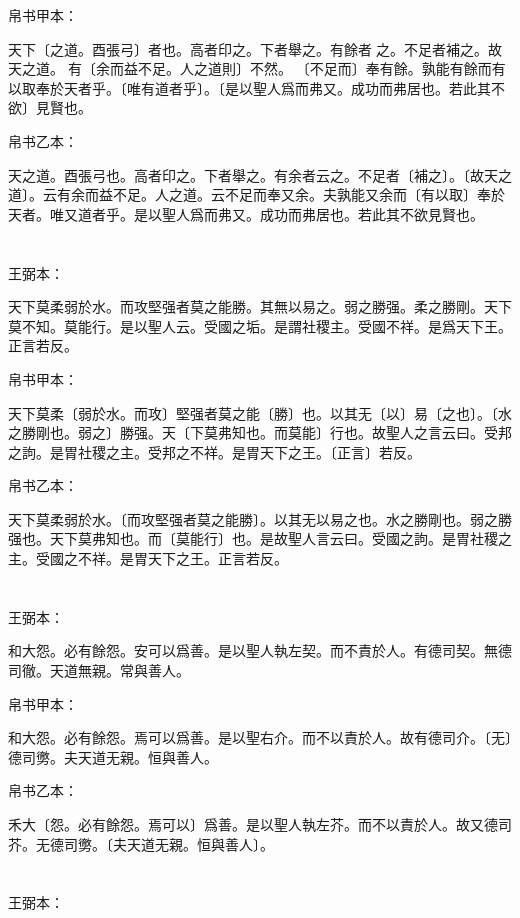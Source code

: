 \documentclass[a5paper]{ctexbook}
\begin{document}
    
    帛书甲本：

    天下〔之道。酉張弓〕者也。高者印之。下者舉之。有餘者𢿃之。不足者補之。故天之道。𢿃有〔余而益不足。人之道則〕不然。𢿃〔不足而〕奉有餘。孰能有餘而有以取奉於天者乎。〔唯有道者乎〕。〔是以聖人爲而弗又。成功而弗居也。若此其不欲〕見賢也。

    帛书乙本：

    天之道。酉張弓也。高者印之。下者舉之。有余者云之。不足者〔補之〕。〔故天之道〕。云有余而益不足。人之道。云不足而奉又余。夫孰能又余而〔有以取〕奉於天者。唯又道者乎。是以聖人爲而弗又。成功而弗居也。若此其不欲見賢也。

    \chapter{}
    王弼本：

    天下莫柔弱於水。而攻堅强者莫之能勝。其無以易之。弱之勝强。柔之勝剛。天下莫不知。莫能行。是以聖人云。受國之垢。是謂社稷主。受國不祥。是爲天下王。正言若反。

    
    帛书甲本：

    天下莫柔〔弱於水。而攻〕堅强者莫之能〔勝〕也。以其无〔以〕易〔之也〕。〔水之勝剛也。弱之〕勝强。天〔下莫弗知也。而莫能〕行也。故聖人之言云曰。受邦之訽。是胃社稷之主。受邦之不祥。是胃天下之王。〔正言〕若反。

    帛书乙本：

    天下莫柔弱於水。〔而攻堅强者莫之能勝〕。以其无以易之也。水之勝剛也。弱之勝强也。天下莫弗知也。而〔莫能行〕也。是故聖人言云曰。受國之訽。是胃社稷之主。受國之不祥。是胃天下之王。正言若反。

    \chapter{}
    王弼本：

    和大怨。必有餘怨。安可以爲善。是以聖人執左契。而不責於人。有德司契。無德司徹。天道無親。常與善人。

    
    帛书甲本：

    和大怨。必有餘怨。焉可以爲善。是以聖右介。而不以責於人。故有德司介。〔无〕德司勶。夫天道无親。恒與善人。

    帛书乙本：

    禾大〔怨。必有餘怨。焉可以〕爲善。是以聖人執左芥。而不以責於人。故又德司芥。无德司勶。〔夫天道无親。恒與善人〕。

    \chapter{}
    王弼本：
\end{document}
